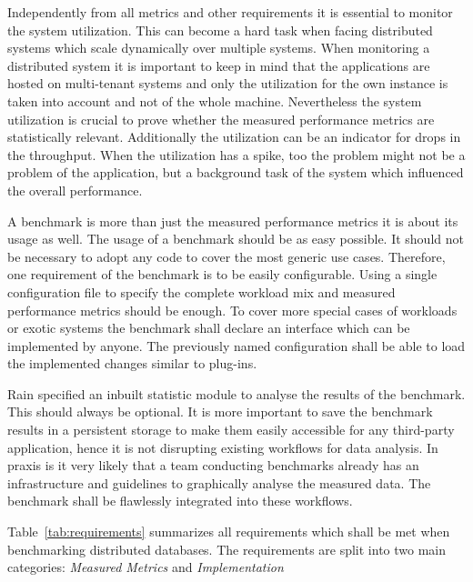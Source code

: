 Independently from all metrics and other requirements it is essential to monitor the system utilization. This can become a hard task when facing distributed systems which scale dynamically over multiple systems. When monitoring a distributed system it is important to keep in mind that the applications are hosted on multi-tenant systems and only the utilization for the own instance is taken into account and not of the whole machine. Nevertheless the system utilization is crucial to prove whether the measured performance metrics are statistically relevant. Additionally the utilization can be an indicator for drops in the throughput. When the utilization has a spike, too the problem might not be a problem of the application, but a background task of the system which influenced the overall performance.

A benchmark is more than just the measured performance metrics it is about its usage as well. The usage of a benchmark should be as easy possible. It should not be necessary to adopt any code to cover the most generic use cases. Therefore, one requirement of the benchmark is to be easily configurable. Using a single configuration file to specify the complete workload mix and measured performance metrics should be enough. To cover more special cases of workloads or exotic systems the benchmark shall declare an interface which can be implemented by anyone. The previously named configuration shall be able to load the implemented changes similar to plug-ins.

Rain specified an inbuilt statistic module to analyse the results of the benchmark. This should always be optional. It is more important to save the benchmark results in a persistent storage to make them easily accessible for any third-party application, hence it is not disrupting existing workflows for data analysis. In praxis is it very likely that a team conducting benchmarks already has an infrastructure and guidelines to graphically analyse the measured data. The benchmark shall be flawlessly integrated into these workflows.

Table~\ref{tab:requirements} summarizes all requirements which shall be met when benchmarking distributed databases. The requirements are split into two main categories: \emph{Measured Metrics} and \emph{Implementation}

